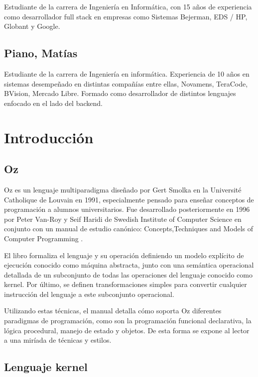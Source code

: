 \documentclass[a4paper,11pt]{article}
\begin{document}
Estudiante de la carrera de Ingeniería en Informática, con 15 años de experiencia como desarrollador full stack en empresas como Sistemas Bejerman, EDS / HP, Globant y Google.


\subsection{Piano, Matías}

Estudiante de la carrera de Ingeniería en informática. Experiencia de 10 años en sistemas desempeñado en distintas compañías entre ellas, Novamens, TeraCode, BVision, Mercado Libre. Formado como desarrollador de distintos lenguajes enfocado en el lado del backend.


\section{Introducción}

\subsection{Oz}

Oz es un lenguaje multiparadigma diseñado por Gert Smolka en la Université Catholique de Louvain en 1991, especialmente pensado para enseñar conceptos de programación a alumnos universitarios. Fue desarrollado posteriormente en 1996 por Peter Van-Roy y Seif Haridi de
Swedish Institute of Computer Science en conjunto con un manual de estudio canónico: Concepts,Techniques and Models of Computer Programming \cite{ctmcp}.

El libro formaliza el lenguaje y su operación definiendo un modelo explícito de ejecución conocido como máquina abstracta, junto con una semántica operacional detallada de un subconjunto de todas las operaciones del lenguaje conocido como kernel. Por último, se definen transformaciones simples para convertir cualquier instrucción del lenguaje a este subconjunto operacional.

Utilizando estas técnicas, el manual detalla cómo soporta Oz diferentes paradigmas de programación, como son la programación funcional declarativa, la lógica procedural, manejo de estado y objetos. De esta forma se expone al lector a una miríada de técnicas y estilos.

\subsection{Lenguaje kernel}
\end{document}
